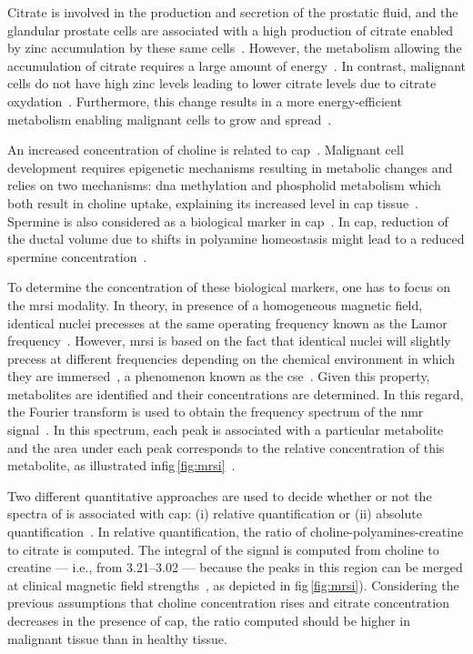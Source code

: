 Citrate is involved in the production and secretion of the prostatic fluid, and the glandular prostate cells are associated with a high production of citrate enabled by zinc accumulation by these same cells~\cite{Costello2006}.
However, the metabolism allowing the accumulation of citrate requires a large amount of energy~\cite{Costello2006}.
In contrast, malignant cells do not have high zinc levels leading to lower citrate levels due to citrate oxydation~\cite{Costello2006}.
Furthermore, this change results in a more energy-efficient metabolism enabling malignant cells to grow and spread~\cite{Costello2006}.

An increased concentration of choline is related to \ac{cap}~\cite{Awwad2012}.
Malignant cell development requires epigenetic mechanisms resulting in metabolic changes and relies on two mechanisms: \ac{dna} methylation and phospholid metabolism which both result in choline uptake, explaining its increased level in \ac{cap} tissue~\cite{Awwad2012}.
Spermine is also considered as a biological marker in \ac{cap}~\cite{Graaf2000,Giskeodegard2013}.
In \ac{cap}, reduction of the ductal volume due to shifts in polyamine homeostasis might lead to a reduced spermine concentration~\cite{Graaf2000}.

To determine the concentration of these biological markers, one has to focus on the \ac{mrsi} modality.
In theory, in presence of a homogeneous magnetic field, identical nuclei precesses at the same operating frequency known as the Lamor frequency~\cite{Haacke1999}.
However, \ac{mrsi} is based on the fact that identical nuclei will slightly precess at different frequencies depending on the chemical environment in which they are immersed~\cite{Haacke1999}, a phenomenon known as the \ac{cse}~\cite{Parfait2010}.
Given this property, metabolites are identified and their concentrations are determined.
In this regard, the Fourier transform is used to obtain the frequency spectrum of the \ac{nmr} signal~\cite{Haacke1999,Parfait2010}.
In this spectrum, each peak is associated with a particular metabolite and the area under each peak corresponds to the relative concentration of this metabolite, as illustrated in\acs{fig}\,\ref{fig:mrsi}~\cite{Parfait2010}.

Two different quantitative approaches are used to decide whether or not the spectra of  is associated with \ac{cap}: (i) relative quantification or (ii) absolute quantification~\cite{Lemaitre2011}.
In relative quantification, the ratio of choline-polyamines-creatine to citrate is computed.
The integral of the signal is computed from choline to creatine --- i.e., from \SIrange{3.21}{3.02}{\ppm} --- because the peaks in this region can be merged at clinical magnetic field strengths~\cite{Hoeks2011,Graaf2000}, as depicted in \acs{fig}\,\ref{fig:mrsi}).
Considering the previous assumptions that choline concentration rises and citrate concentration decreases in the presence of \ac{cap}, the ratio computed should be higher in malignant tissue than in healthy tissue. 

